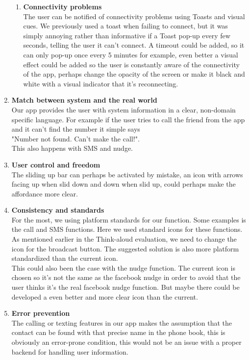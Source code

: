 \documentclass[runningheads,a4paper]{llncs}
\begin{document}
\begin{enumerate}
\begin{enumerate}
    \item \textbf{Connectivity problems}\\
    The user can be notified of connectivity problems using Toasts and visual cues. 
We previously used a toast when failing to connect, but it was simply annoying rather than informative if a Toast pop-up every few seconds, telling the user it can’t connect. A timeout could be added, so it can only pop-up once every 5 minutes for example, even better a visual effect could be added so the user is constantly aware of the connectivity of the app, perhaps change the opacity of the screen or make it black and white with a visual indicator that it’s reconnecting.  
  \end{enumerate}
  \item \textbf{Match between system and the real world
}\\
Our app provides the user with system information in a clear, non-domain specific language. For example if the user tries to call the friend from the app and it can’t find the number it simple says \\
"Number not found. Can't make the call!".\\
This also happens with SMS and nudge.
  \item \textbf{User control and freedom}\\
  The sliding up bar can perhaps be activated by mistake, an icon with arrows facing up when slid down and down when slid up, could perhaps make the affordance more clear.
  \item \textbf{Consistency and standards}\\
  For the most, we using platform standards for our function. Some examples is the call and SMS functions. Here we used standard icons for these functions. 
As mentioned earlier in the Think-aloud evaluation, we need to change the icon for the broadcast button. The suggested solution is also more platform standardized than the current icon. \\
This could also been the case with the nudge function. The current icon is chosen so it’s not the same as the facebook nudge in order to avoid that the user thinks it’s the real facebook nudge function. But maybe there could be developed a even better and more clear icon than the current.
\item \textbf{Error prevention}\\
The calling or texting features in our app makes the assumption that the contact can be found with that precise name in the phone book, this is obviously an error-prone condition, this would not be an issue with a proper backend for handling user information.

\end{enumerate}
\end{document}
